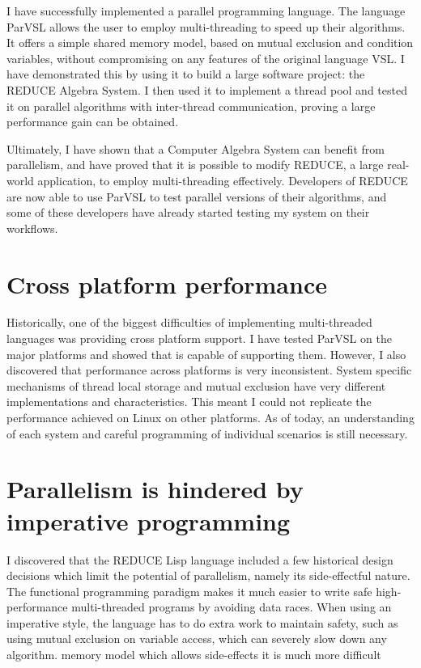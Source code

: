 I have successfully implemented a parallel programming language. The language ParVSL
allows the user to employ multi-threading to speed up their algorithms. It offers
a simple shared memory model, based on mutual exclusion and condition variables,
without compromising on any features of the original language VSL. I have demonstrated
this by using it to build a large software project: the REDUCE Algebra System.
I then used it to implement a thread pool and tested it on parallel algorithms with
inter-thread communication, proving a large performance gain can be obtained.

Ultimately, I have shown that a Computer Algebra System can benefit from parallelism,
and have proved that it is possible to modify REDUCE, a large real-world application,
to employ multi-threading effectively. Developers of REDUCE are now able to
use ParVSL to test parallel versions of their algorithms, and some of these developers
have already started testing my system on their workflows.

\section{Cross platform performance}

Historically, one of the biggest difficulties of implementing multi-threaded languages
was providing cross platform support. I have tested ParVSL on the major platforms and
showed that is capable of supporting them. However, I also discovered that performance
across platforms is very inconsistent. System specific mechanisms of thread local storage
and mutual exclusion have very different implementations and characteristics. This meant
I could not replicate the performance achieved on Linux on other platforms. As of today,
an understanding of each system and careful programming of individual scenarios is still
necessary.

\section{Parallelism is hindered by imperative programming}

I discovered that the REDUCE Lisp language included a few historical design decisions which
limit the potential of parallelism, namely its side-effectful nature. The functional programming
paradigm makes it much easier to write safe high-performance multi-threaded programs by avoiding
data races. When using an imperative style, the language has to do extra work to maintain safety,
such as using mutual exclusion on variable access, which can severely slow down any algorithm.
memory model which allows side-effects it is much more difficult

